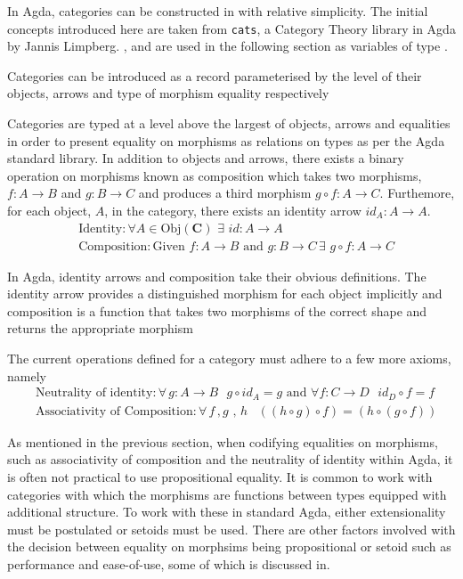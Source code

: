 In Agda, categories can be constructed in with relative simplicity. The initial
concepts introduced here are taken from \verb|cats|, a Category Theory library
in Agda by Jannis Limpberg. ,  and 
are used in the following section as variables of type .

Categories can be introduced as a record parameterised by the level of their
objects, arrows and type of morphism equality respectively


Categories are typed at a level above the largest of objects, arrows and
equalities in order to present equality on morphisms as relations on types as
per the Agda standard library. In addition to objects and arrows, there exists a
binary operation on morphisms known as composition which takes two morphisms,
$f : A \rightarrow B$ and $g : B \rightarrow C$ and produces a third morphism
$g \circ f : A \rightarrow C$. Furthemore, for each object, $A$, in the
category, there exists an identity arrow $id_{A} : A \rightarrow A$.
\begin{align*}
    &\textrm{Identity} : \forall A \in \textrm{Obj}(\textbf{C}) \, \, \exists \, \, id : A \rightarrow A \\
    &\textrm{Composition} : \textrm{Given } f : A \rightarrow B
    \textrm{ and } g : B \rightarrow C \, \exists \, \, g \circ f : A \rightarrow C
\end{align*}

In Agda, identity arrows and composition take their obvious definitions. The identity
arrow provides a distinguished morphism for each object implicitly and
composition is a function that takes two morphisms of the correct shape and
returns the appropriate morphism

The current operations defined for a category must adhere to a few more axioms,
namely
\begin{align*}
    &\textrm{Neutrality of identity} : \forall \, g : A \rightarrow B \, \, \, \,
    g \circ id_{A} = g \textrm{  and    } \forall f : C \rightarrow D \, \,  \, \,
    id_{D} \circ f = f \\
    &\textrm{Associativity of Composition} : \forall \, f \, , g \, \, , \,  h \, \, \,
    \, \, ((h \circ g) \circ f) = (h \circ (g \circ f))
\end{align*}

As mentioned in the previous section, when codifying equalities on morphisms,
such as associativity of composition and the neutrality of identity within
Agda, it is often not practical to use propositional equality. It is common to
work with categories with which the morphisms are functions between types
equipped with additional structure. To work with these in standard Agda, either
extensionality must be postulated or setoids must be used. There are other
factors involved with the decision between equality on morphsims being
propositional or setoid such as performance and ease-of-use, some of which is
discussed in.

